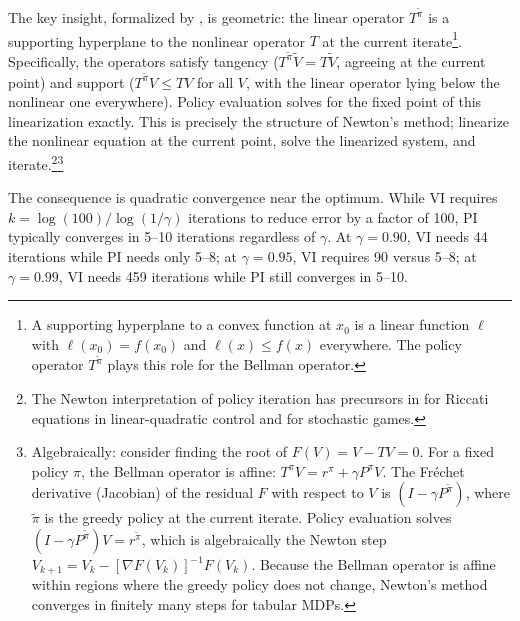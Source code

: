 The key insight, formalized by \citet{puterman1979}, is geometric: the linear operator $T^{\tilde{\pi}}$ is a supporting hyperplane to the nonlinear operator $T$ at the current iterate\footnote{A supporting hyperplane to a convex function at $x_0$ is a linear function $\ell$ with $\ell(x_0) = f(x_0)$ and $\ell(x) \leq f(x)$ everywhere. The policy operator $T^{\tilde{\pi}}$ plays this role for the Bellman operator.}. Specifically, the operators satisfy tangency ($T^{\tilde{\pi}} \tilde{V} = T\tilde{V}$, agreeing at the current point) and support ($T^{\tilde{\pi}} V \leq TV$ for all $V$, with the linear operator lying below the nonlinear one everywhere). Policy evaluation solves for the fixed point of this linearization exactly. This is precisely the structure of Newton's method; linearize the nonlinear equation at the current point, solve the linearized system, and iterate.\footnote{The Newton interpretation of policy iteration has precursors in \citet{kleinman1968} for Riccati equations in linear-quadratic control and \citet{pollatschek1969} for stochastic games.}\footnote{Algebraically: consider finding the root of $F(V) = V - TV = 0$. For a fixed policy $\pi$, the Bellman operator is affine: $T^\pi V = r^\pi + \gamma P^\pi V$. The Fréchet derivative (Jacobian) of the residual $F$ with respect to $V$ is $(I - \gamma P^{\tilde{\pi}})$, where $\tilde{\pi}$ is the greedy policy at the current iterate. Policy evaluation solves $(I - \gamma P^{\tilde{\pi}})V = r^{\tilde{\pi}}$, which is algebraically the Newton step $V_{k+1} = V_k - [\nabla F(V_k)]^{-1} F(V_k)$. Because the Bellman operator is affine within regions where the greedy policy does not change, Newton's method converges in finitely many steps for tabular MDPs.}

The consequence is quadratic convergence near the optimum. While VI requires $k = \log(100) / \log(1/\gamma)$ iterations to reduce error by a factor of 100, PI typically converges in 5--10 iterations regardless of $\gamma$. At $\gamma = 0.90$, VI needs 44 iterations while PI needs only 5--8; at $\gamma = 0.95$, VI requires 90 versus 5--8; at $\gamma = 0.99$, VI needs 459 iterations while PI still converges in 5--10.

